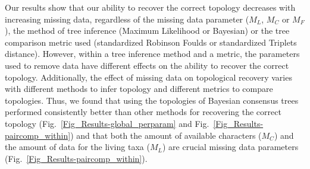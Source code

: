 \documentclass[12pt,letterpaper]{article}
\begin{document}

Our results show that our ability to recover the correct topology decreases with increasing missing data, regardless of the missing data parameter ($M_{L}$, $M_{C}$ or $M_{F}$), the method of tree inference (Maximum Likelihood or Bayesian) or the tree comparison metric used (standardized Robinson Foulds or standardized Triplets distance). 
However, within a tree inference method and a metric, the parameters used to remove data have different effects on the ability to recover the correct topology.
Additionally, the effect of missing data on topological recovery varies with different methods to infer topology and different metrics to compare topologies.
Thus, we found that using the topologies of Bayesian consensus trees performed consistently better than other methods for recovering the correct topology (Fig.~\ref{Fig_Results-global_perparam} and Fig.~\ref{Fig_Results-paircomp_within}) and that both the amount of available characters ($M_{C}$) and the amount of data for the living taxa ($M_{L}$) are crucial missing data parameters (Fig.~\ref{Fig_Results-paircomp_within}).

\end{document}
